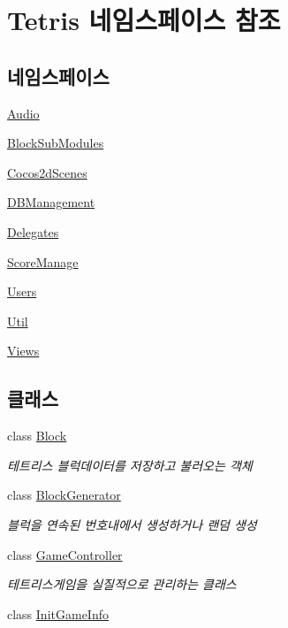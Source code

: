 \hypertarget{namespace_tetris}{}\section{Tetris 네임스페이스 참조}
\label{namespace_tetris}
\subsection*{네임스페이스}
\begin{DoxyCompactItemize}
\item 
 \hyperlink{namespace_tetris_1_1_audio}{Audio}
\item 
 \hyperlink{namespace_tetris_1_1_block_sub_modules}{Block\+Sub\+Modules}
\item 
 \hyperlink{namespace_tetris_1_1_cocos2d_scenes}{Cocos2d\+Scenes}
\item 
 \hyperlink{namespace_tetris_1_1_d_b_management}{D\+B\+Management}
\item 
 \hyperlink{namespace_tetris_1_1_delegates}{Delegates}
\item 
 \hyperlink{namespace_tetris_1_1_score_manage}{Score\+Manage}
\item 
 \hyperlink{namespace_tetris_1_1_users}{Users}
\item 
 \hyperlink{namespace_tetris_1_1_util}{Util}
\item 
 \hyperlink{namespace_tetris_1_1_views}{Views}
\end{DoxyCompactItemize}
\subsection*{클래스}
\begin{DoxyCompactItemize}
\item 
class \hyperlink{class_tetris_1_1_block}{Block}
\begin{DoxyCompactList}\small\item\em 테트리스 블럭데이터를 저장하고 불러오는 객체 \end{DoxyCompactList}\item 
class \hyperlink{class_tetris_1_1_block_generator}{Block\+Generator}
\begin{DoxyCompactList}\small\item\em 블럭을 연속된 번호내에서 생성하거나 랜덤 생성 \end{DoxyCompactList}\item 
class \hyperlink{class_tetris_1_1_game_controller}{Game\+Controller}
\begin{DoxyCompactList}\small\item\em 테트리스게임을 실질적으로 관리하는 클래스 \end{DoxyCompactList}\item 
class \hyperlink{class_tetris_1_1_init_game_info}{Init\+Game\+Info}
\end{DoxyCompactItemize}
